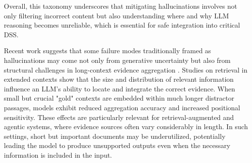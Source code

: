 Overall, this taxonomy underscores that mitigating hallucinations involves not only filtering incorrect content but also understanding where and why LLM reasoning becomes unreliable, which is essential for safe integration into critical DSS.

Recent work suggests that some failure modes traditionally framed as hallucinations may come not only from generative uncertainty but also from structural challenges in long-context evidence aggregation \cite{bianchi2025hidden}. Studies on retrieval in extended contexts show that the size and distribution of relevant information influence an LLM's ability to locate and integrate the correct evidence. When small but crucial "gold" contexts are embedded within much longer distractor passages, models exhibit reduced aggregation accuracy and increased positional sensitivity. These effects are particularly relevant for retrieval-augmented and agentic systems, where evidence sources often vary considerably in length. In such settings, short but important documents may be underutilized, potentially leading the model to produce unsupported outputs even when the necessary information is included in the input. 

